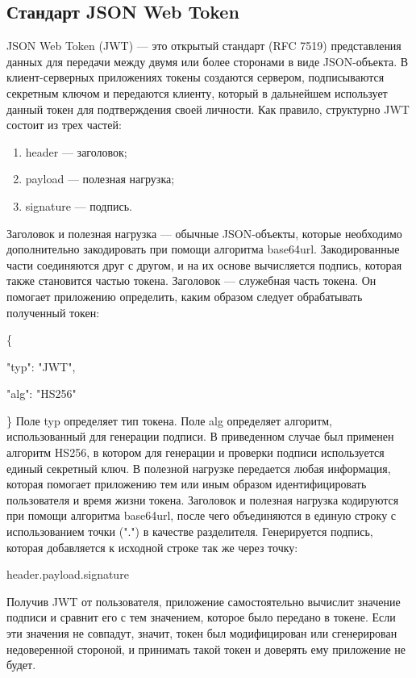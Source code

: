 \subsection{Стандарт JSON Web Token}
JSON Web Token (JWT) — это открытый стандарт (RFC 7519) представления данных для передачи между двумя или более сторонами в виде JSON-объекта. В клиент-серверных приложениях токены создаются сервером, подписываются секретным ключом и передаются клиенту, который в дальнейшем использует данный токен для подтверждения своей личности. Как правило, структурно JWT состоит из трех частей: 
\begin{enumerate}
	\item header — заголовок;
	\item payload — полезная нагрузка;
	\item signature — подпись.
\end{enumerate}
Заголовок и полезная нагрузка — обычные JSON-объекты, которые необходимо дополнительно закодировать при помощи алгоритма base64url. Закодированные части соединяются друг с другом, и на их основе вычисляется подпись, которая также становится частью токена. 
Заголовок — служебная часть токена. Он помогает приложению определить, каким образом следует обрабатывать полученный токен:

\{

	"typ": "JWT",
	
	"alg": "HS256"
	
\}
\newline
Поле typ определяет тип токена. Поле alg определяет алгоритм, использованный для генерации подписи. В приведенном случае был применен алгоритм HS256, в котором для генерации и проверки подписи используется единый секретный ключ. В полезной нагрузке передается любая информация, которая помогает приложению тем или иным образом идентифицировать пользователя и время жизни токена. Заголовок и полезная нагрузка кодируются при помощи алгоритма base64url, после чего объединяются в единую строку с использованием точки (".") в качестве разделителя. Генерируется подпись, которая добавляется к исходной строке так же через точку:
\begin{center}
header.payload.signature
\end{center}
Получив JWT от пользователя, приложение самостоятельно вычислит значение подписи и сравнит его с тем значением, которое было передано в токене. Если эти значения не совпадут, значит, токен был модифицирован или сгенерирован недоверенной стороной, и принимать такой токен и доверять ему приложение не будет. 


\clearpage